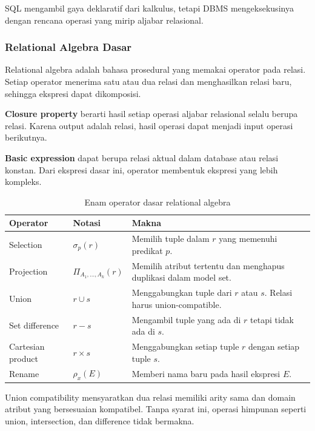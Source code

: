 SQL mengambil gaya deklaratif dari kalkulus, tetapi DBMS mengeksekusinya dengan rencana operasi yang mirip aljabar relasional.

\subsubsection{Relational Algebra Dasar}

\begin{jawab}
Relational algebra adalah bahasa prosedural yang memakai operator pada relasi. Setiap operator menerima satu atau dua relasi dan menghasilkan relasi baru, sehingga ekspresi dapat dikomposisi.
\end{jawab}

\textbf{Closure property} berarti hasil setiap operasi aljabar relasional selalu berupa relasi. Karena output adalah relasi, hasil operasi dapat menjadi input operasi berikutnya.

\textbf{Basic expression} dapat berupa relasi aktual dalam database atau relasi konstan. Dari ekspresi dasar ini, operator membentuk ekspresi yang lebih kompleks.

\begin{table}[H]
\centering
\small
\begin{tabularx}{\textwidth}{|L{0.16\textwidth}|L{0.18\textwidth}|X|}
\hline
\textbf{Operator} & \textbf{Notasi} & \textbf{Makna} \\
\hline
Selection & \(\sigma_p(r)\) & Memilih tuple dalam \(r\) yang memenuhi predikat \(p\). \\
\hline
Projection & \(\Pi_{A_1,\ldots,A_k}(r)\) & Memilih atribut tertentu dan menghapus duplikasi dalam model set. \\
\hline
Union & \(r \cup s\) & Menggabungkan tuple dari \(r\) atau \(s\). Relasi harus union-compatible. \\
\hline
Set difference & \(r-s\) & Mengambil tuple yang ada di \(r\) tetapi tidak ada di \(s\). \\
\hline
Cartesian product & \(r \times s\) & Menggabungkan setiap tuple \(r\) dengan setiap tuple \(s\). \\
\hline
Rename & \(\rho_x(E)\) & Memberi nama baru pada hasil ekspresi \(E\). \\
\hline
\end{tabularx}
\caption{Enam operator dasar relational algebra}
\label{tab:basic-ra-operators}
\end{table}

Union compatibility mensyaratkan dua relasi memiliki arity sama dan domain atribut yang bersesuaian kompatibel. Tanpa syarat ini, operasi himpunan seperti union, intersection, dan difference tidak bermakna.

